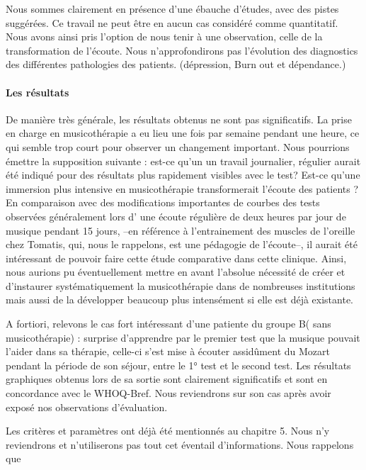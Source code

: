 Nous sommes clairement en présence d'une ébauche d'études, avec des pistes
suggérées. Ce travail ne peut être en aucun cas considéré comme
quantitatif.  Nous avons ainsi pris l'option de nous tenir à une
observation, celle de la transformation de l'écoute. Nous n'approfondirons pas l'évolution des diagnostics des différentes
pathologies des patients.  (dépression, Burn out et dépendance.)
  
\paragraph{Les résultats}
  
  De manière très générale, les résultats obtenus ne
  sont pas significatifs.  La prise en charge en musicothérapie a eu lieu
  une fois par semaine pendant une heure, ce qui semble trop court pour observer un changement important. Nous pourrions émettre la supposition suivante :  est-ce qu'un un travail journalier, régulier aurait été indiqué pour des résultats plus rapidement visibles avec le test?
  Est-ce qu'une immersion plus intensive en musicothérapie transformerait l'écoute des patients ? 
   En comparaison avec des
  modifications importantes de courbes des tests observées généralement  lors d' une écoute
  régulière de deux heures par jour de musique pendant 15 jours, --en référence à l'entrainement des muscles de l'oreille chez Tomatis, qui, nous le rappelons, est une pédagogie de l'écoute--, il aurait été intéressant de pouvoir faire cette étude comparative dans cette clinique. Ainsi, nous aurions pu éventuellement mettre en avant  l'absolue nécessité de créer et d'instaurer systématiquement la musicothérapie dans de nombreuses institutions mais aussi  de la développer beaucoup plus intensément  si elle est déjà existante.
  
  A fortiori, relevons le cas fort intéressant  d'une patiente du groupe B( sans
  musicothérapie) : 
surprise d'apprendre par le premier test que la musique pouvait l'aider
  dans sa thérapie, celle-ci s'est mise à écouter assidûment du Mozart pendant la période de son séjour, entre le 1° test et le second test.  Les résultats
  graphiques obtenus lors de sa sortie sont clairement significatifs
  et sont en concordance avec le WHOQ-Bref.  Nous reviendrons sur son
  cas après avoir exposé nos observations d'évaluation.

Les critères et paramètres ont déjà été mentionnés au chapitre 5. Nous n'y reviendrons et n'utiliserons pas tout cet éventail d'informations. Nous rappelons que 
  
